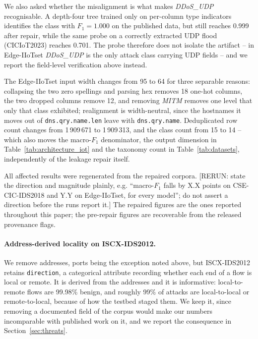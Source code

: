 We also asked whether the misalignment is what makes \emph{DDoS\_UDP}
recognisable. A depth-four tree trained only on per-column type indicators
identifies the class with $F_1=1.000$ on the published data, but still reaches
0.999 after repair, while the same probe on a correctly extracted UDP flood
(CICIoT2023) reaches 0.701. The probe therefore does not isolate the artifact --
in Edge-IIoTset \emph{DDoS\_UDP} is the only attack class carrying UDP fields --
and we report the field-level verification above instead.

The Edge-IIoTset input width changes from 95 to 64 for three separable reasons:
collapsing the two zero spellings and parsing hex removes 18 one-hot columns, the
two dropped columns remove 12, and removing \emph{MITM} removes one level that
only that class exhibited; realignment is width-neutral, since the hostnames it
moves out of \texttt{dns.qry.name.len} leave with \texttt{dns.qry.name}.
Deduplicated row count changes from 1\,909\,671 to 1\,909\,313, and the class
count from 15 to 14 -- which also moves the macro-$F_1$ denominator, the output
dimension in Table~\ref{tab:architecture_iot} and the taxonomy count in
Table~\ref{tab:datasets}, independently of the leakage repair itself.

All affected results were regenerated from the repaired corpora. [RERUN: state
the direction and magnitude plainly, e.g. ``macro-$F_1$ falls by X.X points on
CSE-CIC-IDS2018 and Y.Y on Edge-IIoTset, for every model''; do not assert a
direction before the runs report it.] The repaired figures are the ones reported
throughout this paper; the pre-repair figures are recoverable from the released
provenance flags.

\paragraph{Address-derived locality on ISCX-IDS2012.}
We remove addresses, ports being the exception noted above, but ISCX-IDS2012
retains \texttt{direction}, a categorical attribute recording whether each end of
a flow is local or remote. It is derived from the addresses and it is
informative: local-to-remote flows are 99.98\% benign, and roughly 99\% of
attacks are local-to-local or remote-to-local, because of how the testbed staged
them. We keep it, since removing a documented field of the corpus would make our
numbers incomparable with published work on it, and we report the consequence in
Section~\ref{sec:threats}.

